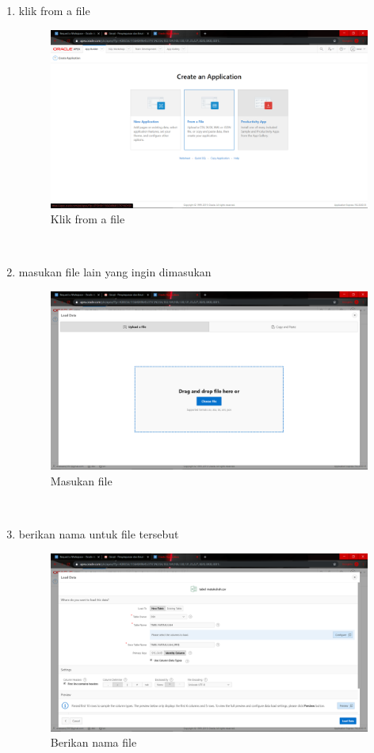 \begin{enumerate}
\item klik from a file 
\begin{figure}[H]
    \centering
    \includegraphics[scale=0.2]{figures/13}
    \caption{Klik from a file}
    \label{Figureanaconda70}
\end{figure} \\

\item masukan file lain yang ingin dimasukan 
\begin{figure}[H]
    \centering
    \includegraphics[scale=0.2]{figures/14}
    \caption{Masukan file}
    \label{Figureanaconda70}
\end{figure} \\


\item berikan nama untuk file tersebut 
\begin{figure}[H]
    \centering
    \includegraphics[scale=0.2]{figures/15}
    \caption{Berikan nama file}
    \label{Environment1}
\end{figure} \\
 

\end{enumerate}
